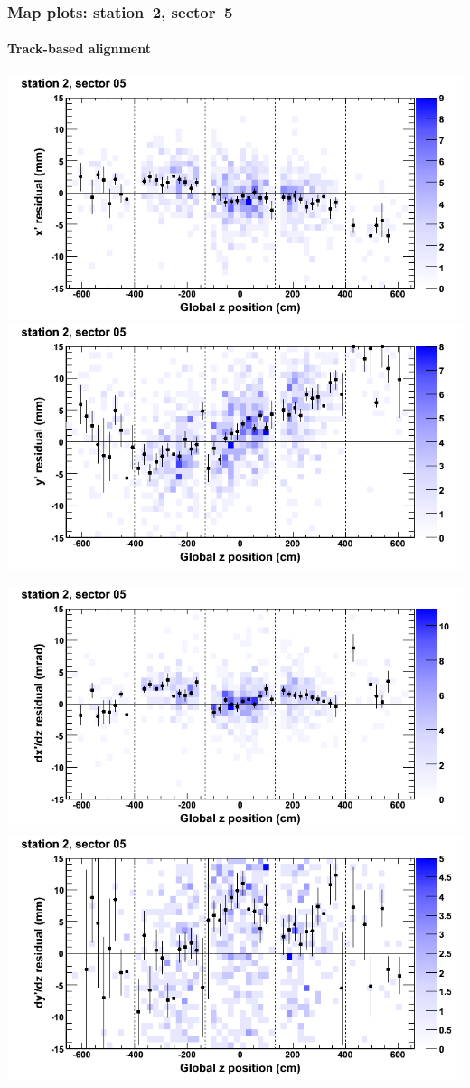 \documentclass[compress]{beamer}
\begin{document}
\begin{frame}
\frametitle{Map plots: station~2, sector~5}
\framesubtitle{Track-based alignment}
\includegraphics[width=0.5\linewidth]{mapplots_re05/DTvsz_st2sec05_x.png}
\includegraphics[width=0.5\linewidth]{mapplots_re05/DTvsz_st2sec05_y.png}

\includegraphics[width=0.5\linewidth]{mapplots_re05/DTvsz_st2sec05_dxdz.png}
\includegraphics[width=0.5\linewidth]{mapplots_re05/DTvsz_st2sec05_dydz.png}
\end{frame}
\end{document}
